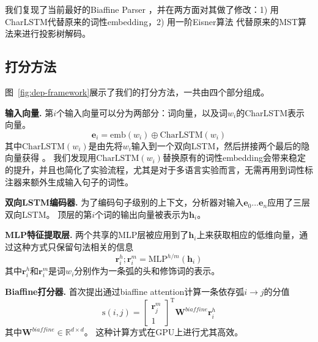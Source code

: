 我们复现了当前最好的Biaffine Parser \citep{dozat-etal-2017-biaffine}，并在两方面对其做了修改：1) 用CharLSTM代替原来的词性embedding，2) 用一阶Eisner算法 \citep{eisner-2000-iwptbook}代替原来的MST算法来进行投影树解码。

\subsection{打分方法}
图~\ref{fig:dep-framework}展示了我们的打分方法，一共由四个部分组成。

\noindent\textbf{输入向量.}
第$i$个输入向量可以分为两部分：词向量，以及词$w_i$的CharLSTM表示向量。
\begin{equation}
	\label{eq:input}
	\mathbf{e}_i=\mathrm{emb}({w_i}) \oplus \mathrm{CharLSTM}(w_i)
\end{equation}
其中$\mathrm{CharLSTM}(w_i)$是由先将$w_i$输入到一个双向LSTM，然后拼接两个最后的隐向量获得 \citep{lample-etal-2016-neural}。
我们发现用$\mathrm{CharLSTM}(w_i)$替换原有的词性embedding会带来稳定的提升，并且也简化了实验流程，尤其是对于多语言实验而言，无需再用到词性标注器来额外生成输入句子的词性。

\noindent\textbf{双向LSTM编码器.}
为了编码句子级别的上下文，分析器对输入$\mathbf{e}_0 \dots \mathbf{e}_n$应用了三层双向LSTM。
顶层的第$i$个词的输出向量被表示为$\mathbf{h}_i$。

\noindent\textbf{MLP特征提取层.}
两个共享的MLP层被应用到了$\mathbf{h}_i$上来获取相应的低维向量，通过这种方式只保留句法相关的信息
\begin{equation}
	\label{mlp-arc}
	\mathbf{r}_i^{h}; \mathbf{r}_i^{m} =\mathrm{MLP}^{h/m} \left( \mathbf{h}_i \right)
\end{equation}
其中$\mathbf{r}_i^{h}$和$\mathbf{r}_i^{m}$是词$w_i$分别作为一条弧的头和修饰词的表示。

\noindent\textbf{Biaffine打分器.}
\citet{dozat-etal-2017-biaffine}首次提出通过biaffine attention计算一条依存弧$i \rightarrow j$的分值
\begin{equation} \label{eq:biaffine}
	\mathrm{s}(i,j) =  \left[
		\begin{array}{c}
			\mathbf{r}_{j}^{m} \\
			1                  
		\end{array}
	\right]^\mathrm{T}
	\mathbf{W}^\textit{biaffine}  \mathbf{r}_{i}^{h}
\end{equation}
其中$\mathbf{W}^\textit{biaffine} \in \mathbb{R}^{d \times d}$。
这种计算方式在GPU上进行尤其高效。


